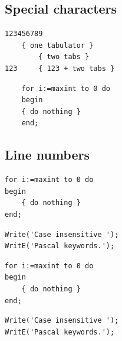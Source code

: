 \documentclass{article}
\begin{document}

\setcounter{subsection}{4}

\subsection{Special characters}\label{uSpecialCharacters}
{\lstset{tabsize=2}
\begin{lstlisting}
123456789
	{ one tabulator }
		{ two tabs }
123		{ 123 + two tabs }
\end{lstlisting}}

{\lstset{showspaces=true,
        showtabs=true,
        tab=\rightarrowfill}
\begin{lstlisting}
    for i:=maxint to 0 do
    begin
	{ do nothing }
    end;
\end{lstlisting}}

\subsection{Line numbers}

{\lstset{numbers=left,numberstyle=\tiny,
    stepnumber=2,numbersep=5pt}
\begin{lstlisting}[firstnumber=100]
for i:=maxint to 0 do
begin
    { do nothing }
end;

\end{lstlisting}

\begin{lstlisting}[firstnumber=last]
Write('Case insensitive ');
WritE('Pascal keywords.');
\end{lstlisting}}

{\lstset{numbers=left,numberstyle=\tiny,stepnumber=2,numbersep=5pt}
\begin{lstlisting}[name=Test]
for i:=maxint to 0 do
begin
    { do nothing }
end;

\end{lstlisting}

\begin{lstlisting}[name=Test]
Write('Case insensitive ');
WritE('Pascal keywords.');
\end{lstlisting}}
\end{document}
